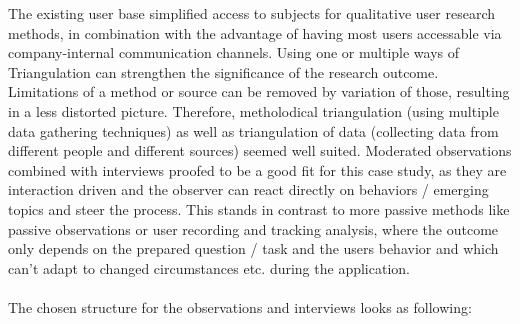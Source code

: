 The existing user base simplified access to subjects for qualitative user research methods, in combination with the advantage of having most users accessable via company-internal communication channels.
Using one or multiple ways of Triangulation \cite[p. 264]{Interactiondesign:2019ys} can strengthen the significance of the research outcome. Limitations of a method or source can be removed by variation of those, resulting in a less distorted picture.
Therefore, metholodical triangulation (using multiple data gathering techniques) as well as triangulation of data (collecting data from different people and different sources) seemed well suited.
Moderated observations combined with interviews proofed to be a good fit for this case study, as they are interaction driven and the observer can react directly on behaviors / emerging topics and steer the process.
This stands in contrast to more passive methods like passive observations or user recording and tracking analysis, where the outcome only depends on the
prepared question / task and the users behavior and which can't adapt to changed circumstances etc. during the application.
\\\\
The chosen structure for the observations and interviews looks as following:

